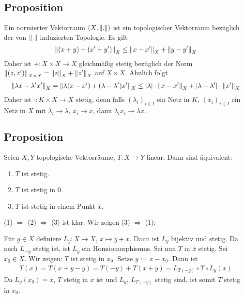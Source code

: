 \subsection{Proposition} %
\label{sub:23}
Ein normierter Vektorraum $(X, \norm{.})$ ist ein topologischer Vektorraum bezüglich der von $\norm{.}$ induzierten Topologie.
Es gilt 
\begin{align*}
	\norm[X]{(x+y) - (x'+y')} \le \norm[X]{x-x'} + \norm[X]{y-y'}   
\end{align*}
Daher ist $+ : X \times X \to X$ gleichmäßig stetig bezüglich der Norm $\norm[X \times X]{(z,z')} = \norm[X]{z} + \norm[X]{z'}$ auf $X \times X$. Ähnlich folgt
\begin{align*}
	\norm[X]{\lambda x - \lambda' x'} = \norm[X]{\lambda (x-x') + (\lambda -\lambda')x'} \le \abs*{\lambda } \cdot \norm[X]{x-x'} + \abs*{\lambda -\lambda'} \cdot 
	\norm[X]{x'}      
\end{align*}
Daher ist $\cdot : K \times X \to X$ stetig, denn falls $(\lambda_i)_{i \in I}$ ein Netz in $K$, $(x_i)_{i \in I}$ ein Netz in $X$ mit $\lambda_i \to \lambda $, $x_i\to x$,
dann $\lambda_i x_i \to \lambda x$.

\subsection{Proposition} %
\label{sub:24}
Seien $X,Y$ topologische Vektorräume, $T : X \to Y$ linear. Dann sind äquivalent:
\begin{enumerate}[(1)]
	\item $T$ ist stetig.
	\item $T$ ist stetig in $0$.
	\item $T$ ist stetig in einem Punkt $\overline{x}$.
\end{enumerate}
(1) $\Rightarrow$ (2) $\Rightarrow $ (3) ist klar. Wir zeigen (3) $\Rightarrow$ (1):

Für $y \in X$ definiere $L_y : X \to X$, $x \mapsto y+ x$. Dann ist $L_y$ bijektiv und stetig. Da auch $L_{-y}$ stetig ist, ist $L_y$ ein Homöomorphismus. Sei nun $T$ in 
$\overline{x}$ stetig. Sei $x_0 \in X$. Wir zeigen: $T$ ist stetig in $x_0$. Setze $y := \overline{x} - x_0$. Dann ist
\begin{align*}
	T(x) = T(x+y-y) = T(-y) + T(x+y) = L_{T(-y)} \circ T \circ L_y (x)
\end{align*}
Da $L_y(x_0) = \overline{x}$, $T$ stetig in $\overline{x}$ ist und $L_y$, $L_{T(-y)}$ stetig sind, ist somit $T$ stetig in $x_0$. \bewende

